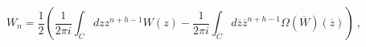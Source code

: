 \begin{equation}
W_n=\frac{1}{2}\left(\frac{1}{2\pi i}\int_C dz z^{n+h-1}
W(z)-\frac{1}{2\pi i}\int_C d\overline{z}
\overline{z}^{n+h-1}\Omega (\overline{W})(
\overline{z})\right) \ ,
\end{equation}

